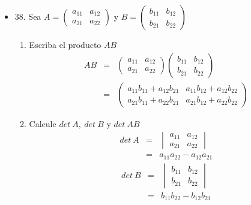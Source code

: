 \documentclass[12pt]{article}
\theoremstyle{plain}
\theoremstyle{definition}
\begin{document}
\begin{itemize}
    \item 38. Sea $A=\begin{pmatrix}a_{11}& a_{12}\\ a_{21} & a_{22}\end{pmatrix}$ y $B=\begin{pmatrix}b_{11}& b_{12}\\ b_{21} & b_{22}\end{pmatrix}$
    \begin{enumerate}
        \item Escriba el producto $AB$
        \begin{eqnarray*}
        AB&=&\begin{pmatrix}a_{11}& a_{12}\\ a_{21} & a_{22}\end{pmatrix}
        \begin{pmatrix}b_{11}& b_{12}\\ b_{21} & b_{22}\end{pmatrix}\\
        &=&
        \begin{pmatrix}a_{11}b_{11}+a_{12}b_{21} & a_{11}b_{12}+a_{12}b_{22}\\
        a_{21}b_{11}+a_{22}b_{21}&a_{21}b_{12}+a_{22}b_{22}\end{pmatrix}
        \end{eqnarray*}
        
        \item Calcule $det\ A, \ det \ B$ y $det\ AB$
        \begin{eqnarray*}
        det\ A&=&\begin{vmatrix}a_{11}& a_{12}\\ a_{21} & a_{22}\end{vmatrix}\\
        &=&a_{11}a_{22}-a_{12}a_{21}
        \end{eqnarray*}
        \begin{eqnarray*}
        det\ B&=&\begin{vmatrix}b_{11}& b_{12}\\ b_{21} & b_{22}\end{vmatrix}\\
        &=&b_{11}b_{22}-b_{12}b_{21}
        \end{eqnarray*}
        

\end{enumerate}
\end{itemize}
\end{document}
